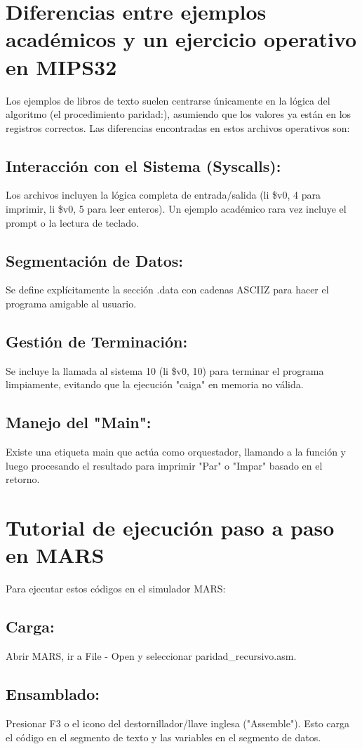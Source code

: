 \documentclass{article}
\begin{document}
\section{Diferencias entre ejemplos académicos y un ejercicio operativo en MIPS32}
Los ejemplos de libros de texto suelen centrarse únicamente en la lógica del algoritmo (el procedimiento paridad:), asumiendo que los valores ya están en los registros correctos.
Las diferencias encontradas en estos archivos operativos son:
\subsection{Interacción con el Sistema (Syscalls):}
Los archivos incluyen la lógica completa de entrada/salida (li \$v0, 4 para imprimir, li \$v0, 5 para leer enteros). Un ejemplo académico rara vez incluye el prompt o la lectura de teclado.
\subsection{Segmentación de Datos:}
Se define explícitamente la sección .data con cadenas ASCIIZ para hacer el programa amigable al usuario.
\subsection{Gestión de Terminación:}
 Se incluye la llamada al sistema 10 (li \$v0, 10) para terminar el programa limpiamente, evitando que la ejecución "caiga" en memoria no válida.
\subsection{Manejo del "Main":}
Existe una etiqueta main que actúa como orquestador, llamando a la función y luego procesando el resultado para imprimir "Par" o "Impar" basado en el retorno.

\section{Tutorial de ejecución paso a paso en MARS}
Para ejecutar estos códigos en el simulador MARS:
\subsection{Carga:}
Abrir MARS, ir a File - Open y seleccionar paridad\_recursivo.asm.
\subsection{Ensamblado:}
Presionar F3 o el icono del destornillador/llave inglesa ("Assemble"). Esto carga el código en el segmento de texto y las variables en el segmento de datos.
\end{document}
